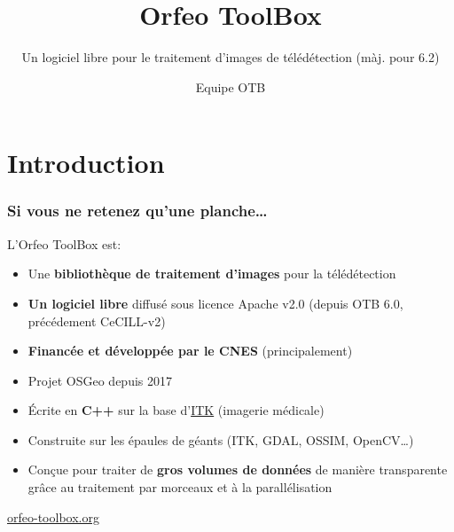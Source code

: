 \documentclass[8pt]{beamer}
\title{Orfeo ToolBox}
\subtitle{Un logiciel libre pour le traitement d'images de télédétection (màj.  pour 6.2)}
\author{Equipe OTB}%
\date{}
\begin{document}
\begin{frame}
\titlepage
\end{frame}

\section*{Introduction}

\begin{frame}
\frametitle{Si vous ne retenez qu'une planche\ldots}
\begin{block}{L'Orfeo ToolBox est:}
\begin{itemize}
\item Une \textbf{bibliothèque de traitement d'images} pour la télédétection
\item \textbf{Un logiciel libre} diffusé sous licence Apache v2.0 (depuis OTB 6.0, précédement CeCILL-v2)
\item \textbf{Financée et développée par le CNES} (principalement)
\item Projet OSGeo depuis 2017
\item Écrite en \textbf{C++} sur la base d'\href{www.itk.org}{ITK} (imagerie médicale)
\item Construite sur les épaules de géants (ITK, GDAL, OSSIM, OpenCV\ldots)
\item Conçue pour traiter de \textbf{gros volumes de données} de manière transparente grâce au traitement par morceaux et à la parallélisation
\end{itemize}
\end{block}

\begin{center}
{\huge\textcolor{red}{\href{http://www.orfeo-toolbox.org}{orfeo-toolbox.org}}}
\end{center}

\end{frame}
\end{document}
